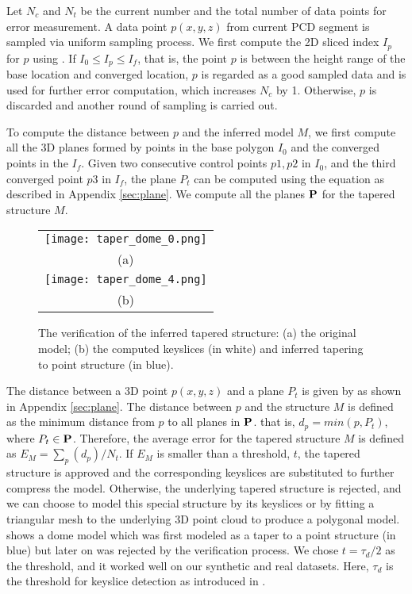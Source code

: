 Let $N_c$ and $N_t$ be the current number and the total number of
data points for error measurement.
A data point $p(x, y, z)$ from current PCD segment is sampled via
uniform sampling process.
We first compute the 2D sliced index $I_p$ for $p$ using .
If $I_0 \le I_p \le I_f$, that is, the point $p$ is between the
height range of the base location and converged location,
$p$ is regarded as a good sampled data and is used for further
error computation, which increases $N_c$ by 1.
Otherwise, $p$ is discarded and another round of sampling is carried out.

To compute the distance between $p$ and the inferred model $M$,
we first compute all the 3D planes formed by points in the base polygon
$I_0$ and the converged points in the $I_f$.
Given two consecutive control points $p1, p2$ in $I_0$, and
the third converged point $p3$ in $I_f$, the plane $P_t$ can be computed using
the equation  as described in Appendix \ref{sec:plane}.
We compute all the planes ${\bf P }$ for the tapered structure $M$.

\begin{figure}[htbp]
\begin{center}
\begin{tabular}{c}
\texttt{[image: taper\_dome\_0.png]} \\
(a) \\
\texttt{[image: taper\_dome\_4.png]} \\
(b)
\end{tabular}
\end{center}
\caption{The verification of the inferred tapered structure:
(a) the original model;
(b) the computed keyslices (in white) and inferred tapering to point structure (in blue).
}
\label{fig:taper_taper_dome}
\end{figure}

The distance between a 3D point $p(x, y, z)$ and a plane $P_t$ is given by
 as shown in Appendix \ref{sec:plane}.
The distance between $p$ and the structure $M$ is defined as the minimum
distance from $p$ to all planes in ${\bf P }$.
that is, $d_p = min(p, P_t)$, where $P_t \in {\bf P}$.
Therefore, the average error for the tapered structure $M$ is defined as
$E_M = \sum_p(d_p)/N_t$.
If $E_M$ is smaller than a threshold, $t$,
the tapered structure is approved and
the corresponding keyslices are substituted to further compress the model.
Otherwise, the underlying tapered structure is rejected,
and we can choose to model this special structure by its keyslices or
by fitting a triangular mesh to the underlying 3D point cloud
to produce a polygonal model.
 shows a dome model which was first modeled
as a taper to a point structure (in blue)
but later on was rejected by the verification process.
We chose $t = \tau_d/2$ as the threshold,
and it worked well on our synthetic and real datasets.
Here, $\tau_d$ is the threshold for keyslice detection
as introduced in .


